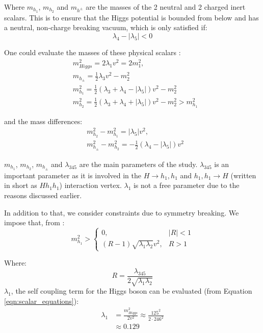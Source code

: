 \documentclass[12pt]{article}
\begin{document}
Where $m_{h_1}$, $m_{h_2}$ and $m_{h^\pm}$ are the masses of the 2 neutral and 2 charged inert scalars. This is to ensure that the Higgs potential is bounded from below and has a neutral, non-charge breaking vacuum, which is only satisfied if:
\begin{equation}
    \lambda_4 - |\lambda_5| < 0
\end{equation}

One could evaluate the masses of these physical scalars \cite{Belyaev:2016lok}:
\begin{align}
    \label{eqn:scalar_equations}
    &m_{Higgs}^2 = 2\lambda_1v^2 = 2m^2_1,\\
    &m_{h_\pm} = \frac{1}{2}\lambda_3v^2-m^2_2 \\
    \label{eqn:massdmscalar}
    &m_{h_1}^2 = \frac{1}{2}(\lambda_3 + \lambda_4 - |\lambda_5|)v^2 - m_2^2\\
    &m_{h_2}^2 = \frac{1}{2}(\lambda_3 + \lambda_4 + |\lambda_5|)v^2 - m_2^2 > m^2_{h_1}
\end{align}

and the mass differences: 
\begin{align}
    &m_{h_2}^2 - m_{h_1}^2 =  |\lambda_5|v^2, \\
    &m_{h_\pm}^2 - m_{h_2}^2 = -\frac{1}{2}(\lambda_4 - |\lambda_5|)v^2
\end{align}

$m_{h_1}$, $m_{h_2}$, $m_{h_\pm}$ and $\lambda_{345}$ are the main parameters of the study. $\lambda_{345}$ is an important parameter as it is involved in the $H\rightarrow h_1,h_1$ and $h_1,h_1 \rightarrow H$ (written in short as $Hh_1h_1$) interaction vertex. $\lambda_1$ is not a free parameter due to the reasons discussed earlier.

In addition to that, we consider constraints due to symmetry breaking. We impose that, from \cite{Belyaev:2016lok, Ginzburg2010}:
\begin{equation}
    m_{h_1}^2 >
        \begin{cases}
         0, & |R| < 1\\
         (R-1) \sqrt{\lambda_1\lambda_2} v^2, & R>1
        \end{cases}
        \label{eqn:R}
\end{equation}

Where:
\begin{equation}
    R = \frac{\lambda_{345}}{2\sqrt{\lambda_1\lambda_2}}
\end{equation}
$\lambda_1$, the self coupling term for the Higgs boson can be evaluated (from Equation \ref{eqn:scalar_equations}):
\begin{equation}
    \begin{split}
        \lambda_1 &= \frac{m^2_{Higgs}}{2 v^2}
                \approx\frac{125^2}{2\cdot 246 ^ 2} \\
                &\approx0.129
    \end{split}
\end{equation}
\end{document}
